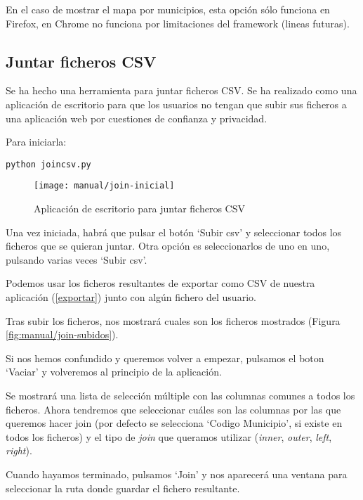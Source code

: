 En el caso de mostrar el mapa por municipios, esta opción sólo funciona en Firefox, en Chrome no funciona por limitaciones del framework (lineas futuras).

\newpage

\subsection{Juntar ficheros CSV}

Se ha hecho una herramienta para juntar ficheros CSV. Se ha realizado como una aplicación de escritorio para que los usuarios no tengan que subir sus ficheros a una aplicación web por cuestiones de confianza y privacidad.

Para iniciarla:

\begin{lstlisting}
python joincsv.py
\end{lstlisting}

\begin{figure}[!h]
	\centering
	\texttt{[image: manual/join-inicial]}
	\caption{Aplicación de escritorio para juntar ficheros CSV}
	\label{fig:manual/join-inicial}
\end{figure}
\FloatBarrier

Una vez iniciada, habrá que pulsar el botón `Subir csv' y seleccionar todos los ficheros que se quieran juntar. Otra opción es seleccionarlos de uno en uno, pulsando varias veces `Subir csv'.

Podemos usar los ficheros resultantes de exportar como CSV de nuestra aplicación (\ref{exportar}) junto con algún fichero del usuario.

Tras subir los ficheros, nos mostrará cuales son los ficheros mostrados (Figura \ref{fig:manual/join-subidos}).


Si nos hemos confundido y queremos volver a empezar, pulsamos el boton `Vaciar' y volveremos al principio de la aplicación.

Se mostrará una lista de selección múltiple con las columnas comunes a todos los ficheros. Ahora tendremos que seleccionar cuáles son las columnas por las que queremos hacer join (por defecto se selecciona `Codigo Municipio', si existe en todos los ficheros) y el tipo de \textit{join} que queramos utilizar (\textit{inner}, \textit{outer}, \textit{left}, \textit{right}).

Cuando hayamos terminado, pulsamos `Join' y nos aparecerá una ventana para seleccionar la ruta donde guardar el fichero resultante.

